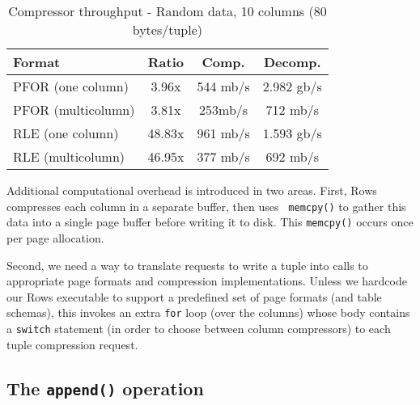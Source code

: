 \documentclass{sig-alternate-sigmod08}
\newcommand{\rows}{Rows\xspace}
\begin{document}
\begin{table}
\caption{Compressor throughput - Random data, 10 columns (80 bytes/tuple)}
\centering
\label{table:perf}
\begin{tabular}{|l|c|c|c|} \hline
Format     & Ratio & Comp. & Decomp. \\ \hline %
PFOR (one column)       &   3.96x      &    544 mb/s     &    2.982 gb/s  \\ \hline %
PFOR (multicolumn) & 3.81x  &  253mb/s &   712 mb/s  \\ \hline %
RLE (one column)       &   48.83x    &  961 mb/s & 1.593 gb/s \\ \hline %
RLE (multicolumn) & 46.95x  & 377 mb/s & 692 mb/s      \\  %
\hline\end{tabular}
\end{table}


Additional computational overhead is introduced in two areas.  First,
\rows compresses each column in a separate buffer, then uses {\tt
  memcpy()} to gather this data into a single page buffer before
writing it to disk.  This {\tt memcpy()} occurs once per page
allocation.

Second, we need a way to translate requests to write a tuple into
calls to appropriate page formats and compression implementations.
Unless we hardcode our \rows executable to support a predefined set of
page formats (and table schemas), this invokes an extra {\tt for} loop
(over the columns) whose body contains a {\tt switch} statement (in
order to choose between column compressors) to each tuple compression
request.


\subsection{The {\tt \large append()} operation}
\end{document}
